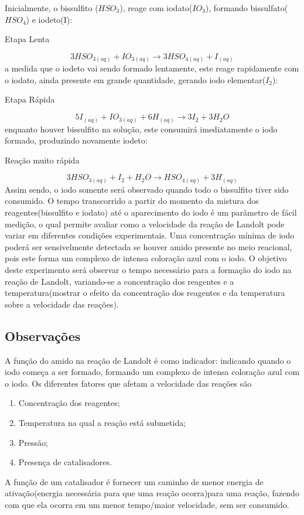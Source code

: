 \documentclass{article}
\begin{document}
Inicialmente, o bissulfito ($HSO_{3}$), reage com iodato($IO_{3}$), formando bissulfato($HSO_{4}$) e iodeto(I):
\begin{center}
  Etapa Lenta
\end{center}
\begin{equation}
  3HSO_{3(aq)} + IO_{3(aq)} \rightarrow 3HSO_{4(aq)}+I_{(aq)} 
  \label{eq:eq1}
\end{equation}
a medida que o iodeto vai sendo formado lentamente, este reage rapidamente com o iodato, ainda presente em grande quantidade, gerando iodo elementar($I_2$):
\begin{center} 
  Etapa Rápida
\end{center}
\begin{equation}
  5I_{(aq)} + IO_{3(aq)} + 6H_{(aq)} \rightarrow 3I_2 + 3H_2O
  \label{eq:eq2}
\end{equation}
enquanto houver bissulfito na solução, este consumirá imediatamente o iodo formado, produzindo novamente iodeto:
\newpage
\begin{center}
Reação muito rápida
\end{center}
\begin{equation}
  3HSO_{3(aq)}+I_2+H_2O \rightarrow HSO_{4(aq)}+3H_{(aq)}
  \label{eq:eq3}
\end{equation}
Assim sendo, o iodo somente será observado quando todo o bissulfito tiver sido consumido.
O tempo transcorrido a partir do momento da mistura dos reagentes(bissulfito e iodato) até o aparecimento do iodo é um parâmetro de fácil medição, o qual permite avaliar como a velocidade da reação de Landolt pode variar em diferentes condições experimentais. Uma concentração mínima de iodo poderá ser sensivelmente detectada se houver amido presente no meio reacional, pois este forma um complexo de intensa coloração azul com o iodo.
O objetivo deste experimento será observar o tempo necessário para a formação do iodo na reação de Landolt, variando-se a concentração dos reagentes e a temperatura(mostrar o efeito da concentração dos reagentes e da temperatura sobre a velocidade das reações).
\subsection{Observações}
A função do amido na reação de Landolt é como indicador: indicando quando o iodo começa a ser formado, formando um complexo de intensa coloração azul com o iodo.
Os diferentes fatores que afetam a velocidade das reações são 
\begin{enumerate}
  \item Concentração dos reagentes;
  \item Temperatura na qual a reação está submetida;
  \item Pressão;
  \item Presença de catalisadores. 
\end{enumerate}
A função de um catalisador é fornecer um caminho de menor energia de ativação(energia necessária para que uma reação ocorra)para uma reação, fazendo com que ela ocorra em um menor tempo/maior velocidade, sem ser consumido.
\end{document}
